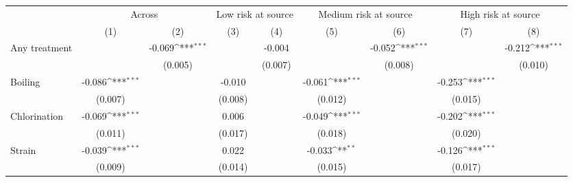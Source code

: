 {
\def\sym#1{\ifmmode^{#1}\else\(^{#1}\)\fi}
\begin{tabular}{l*{8}{c}}
\hline\hline
                    &\multicolumn{2}{c}{Across}                 &\multicolumn{2}{c}{Low risk at source}     &\multicolumn{2}{c}{Medium risk at source}  &\multicolumn{2}{c}{High risk at source}    \\\cmidrule(lr){2-3}\cmidrule(lr){4-5}\cmidrule(lr){6-7}\cmidrule(lr){8-9}
                    &\multicolumn{1}{c}{(1)}         &\multicolumn{1}{c}{(2)}         &\multicolumn{1}{c}{(3)}         &\multicolumn{1}{c}{(4)}         &\multicolumn{1}{c}{(5)}         &\multicolumn{1}{c}{(6)}         &\multicolumn{1}{c}{(7)}         &\multicolumn{1}{c}{(8)}         \\
\hline
Any treatment &                     &      -0.069\sym{***}&                     &      -0.004         &                     &      -0.052\sym{***}&                     &      -0.212\sym{***}\\
                    &                     &     (0.005)         &                     &     (0.007)         &                     &     (0.008)         &                     &     (0.010)         \\
Boiling             &      -0.086\sym{***}&                     &      -0.010         &                     &      -0.061\sym{***}&                     &      -0.253\sym{***}&                     \\
                    &     (0.007)         &                     &     (0.008)         &                     &     (0.012)         &                     &     (0.015)         &                     \\
Chlorination        &      -0.069\sym{***}&                     &       0.006         &                     &      -0.049\sym{***}&                     &      -0.202\sym{***}&                     \\
                    &     (0.011)         &                     &     (0.017)         &                     &     (0.018)         &                     &     (0.020)         &                     \\
Strain              &      -0.039\sym{***}&                     &       0.022         &                     &      -0.033\sym{**} &                     &      -0.126\sym{***}&                     \\
                    &     (0.009)         &                     &     (0.014)         &                     &     (0.015)         &                     &     (0.017)         &                     \\

\end{tabular}}
